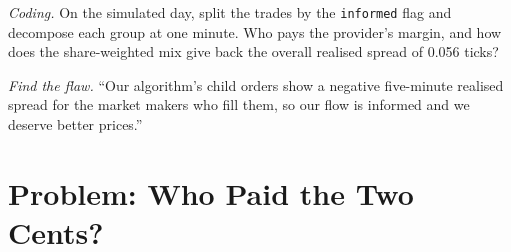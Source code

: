 \begin{exercise}[$\star\star\star$]\label{exo:mx:decomposing-the-spread:7}
\emph{Coding.} On the simulated day, split the trades by the \texttt{informed} flag and decompose each group at one minute. Who pays the provider's margin,
and how does the share-weighted mix give back the overall realised spread of 0.056 ticks?
\end{exercise}

\begin{exercise}[$\star\star\star$]\label{exo:mx:decomposing-the-spread:8}
\emph{Find the flaw.} ``Our algorithm's child orders show a negative five-minute realised spread for the market makers who fill them, so our flow is
informed and we deserve better prices.''
\end{exercise}

\section{Problem: Who Paid the Two Cents?}

